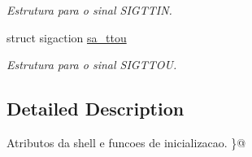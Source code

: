 \begin{DoxyCompactItemize}
\begin{DoxyCompactList}\small\item\em Estrutura para o sinal SIGTTIN. \end{DoxyCompactList}\item 
\hypertarget{group__Initializer_ga368acdb3dffe16d4b183e3549cb68b91}{
struct sigaction \hyperlink{group__Initializer_ga368acdb3dffe16d4b183e3549cb68b91}{sa\_\-ttou}}
\label{group__Initializer_ga368acdb3dffe16d4b183e3549cb68b91}

\begin{DoxyCompactList}\small\item\em Estrutura para o sinal SIGTTOU. \end{DoxyCompactList}\end{DoxyCompactItemize}


\subsection{Detailed Description}
Atributos da shell e funcoes de inicializacao. \}@ 
